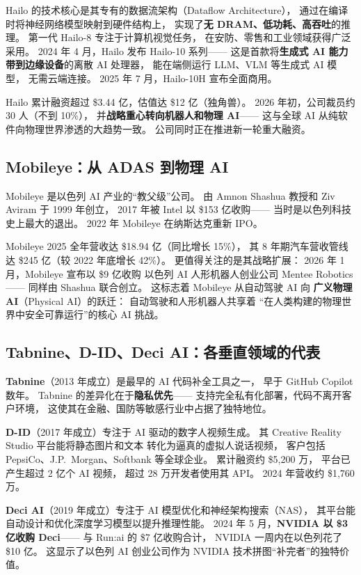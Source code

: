 Hailo 的技术核心是其专有的数据流架构（Dataflow Architecture），
通过在编译时将神经网络模型映射到硬件结构上，
实现了\textbf{无 DRAM、低功耗、高吞吐}的推理。
第一代 Hailo-8 专注于计算机视觉任务，
在安防、零售和工业领域获得广泛采用。
2024 年 4 月，Hailo 发布 Hailo-10 系列——
这是首款将\textbf{生成式 AI 能力带到边缘设备}的离散 AI 处理器，
能在端侧运行 LLM、VLM 等生成式 AI 模型，
无需云端连接。
2025 年 7 月，Hailo-10H 宣布全面商用。

Hailo 累计融资超过 \$3.44 亿，估值达 \$12 亿（独角兽）。
2026 年初，公司裁员约 30 人（不到 10\%），
并\textbf{战略重心转向机器人和物理 AI}——
这与全球 AI 从纯软件向物理世界渗透的大趋势一致。
公司同时正在推进新一轮重大融资。

\subsection{Mobileye：从 ADAS 到物理 AI}

Mobileye 是以色列 AI 产业的``教父级''公司。
由 Amnon Shashua 教授和 Ziv Aviram 于 1999 年创立，
2017 年被 Intel 以 \$153 亿收购——
当时是以色列科技史上最大的退出。
2022 年 Mobileye 在纳斯达克重新 IPO。

Mobileye 2025 全年营收达 \$18.94 亿（同比增长 15\%），
其 8 年期汽车营收管线达 \$245 亿（较 2022 年底增长 42\%）。
更值得关注的是其战略扩展：
2026 年 1 月，Mobileye 宣布以 \$9 亿收购
以色列 AI 人形机器人创业公司 Mentee Robotics——
同样由 Shashua 联合创立。
这标志着 Mobileye 从自动驾驶 AI 向
\textbf{广义物理 AI}（Physical AI）的跃迁：
自动驾驶和人形机器人共享着
``在人类构建的物理世界中安全可靠运行''的核心 AI 挑战。

\subsection{Tabnine、D-ID、Deci AI：各垂直领域的代表}

\textbf{Tabnine}（2013 年成立）是最早的 AI 代码补全工具之一，
早于 GitHub Copilot 数年。
Tabnine 的差异化在于\textbf{隐私优先}——
支持完全私有化部署，代码不离开客户环境，
这使其在金融、国防等敏感行业中占据了独特地位。

\textbf{D-ID}（2017 年成立）专注于 AI 驱动的数字人视频生成。
其 Creative Reality Studio 平台能将静态图片和文本
转化为逼真的虚拟人说话视频，
客户包括 PepsiCo、J.P.\ Morgan、Softbank 等全球企业。
累计融资约 \$5,200 万，
平台已产生超过 2 亿个 AI 视频，
超过 28 万开发者使用其 API。
2024 年营收约 \$1,760 万。

\textbf{Deci AI}（2019 年成立）专注于
AI 模型优化和神经架构搜索（NAS），
其平台能自动设计和优化深度学习模型以提升推理性能。
2024 年 5 月，\textbf{NVIDIA 以 \$3 亿收购 Deci}——
与 Run:ai 的 \$7 亿收购合计，
NVIDIA 一周内在以色列花了 \$10 亿。
这显示了以色列 AI 创业公司作为
NVIDIA 技术拼图``补完者''的独特价值。

